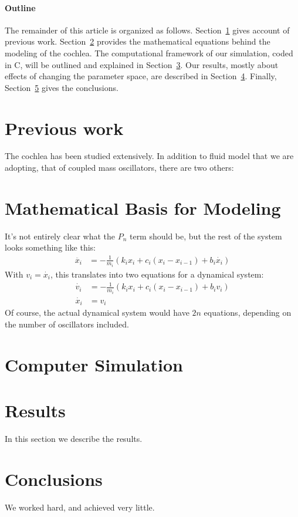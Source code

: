 \documentclass[12pt]{article}
\begin{document}
\paragraph{Outline}
The remainder of this article is organized as follows.
Section~\ref{previous work} gives account of previous work. Section~\ref{modeling} provides the mathematical equations behind the modeling of the cochlea. The computational framework of our simulation, coded in C, will be outlined and explained in Section~\ref{computer simulation}. Our results, mostly about effects of changing the parameter space, are described in Section~\ref{results}.
Finally, Section~\ref{conclusions} gives the conclusions.

\section{Previous work}\label{previous work}
The cochlea has been studied extensively. In addition to fluid model that we are adopting, that of coupled mass oscillators, there are two others: 


\section{Mathematical Basis for Modeling}\label{modeling}
It's not entirely clear what the $P_n$ term should be, but the rest of the system looks something like this:
\begin{align*}
  \ddot{x_i} &= - \frac{1}{m_i} \left( k_i x_i + c_i (x_i-x_{i-1}) + b_i \dot{x_i} \right)
\end{align*}
With $v_i=\dot{x_i}$, this translates into two equations for a dynamical system:
\begin{align*}
  \dot{v_i} &= - \frac{1}{m_i} \left( k_i x_i + c_i (x_i-x_{i-1}) + b_i v_i \right) \\
  \dot{x_i} &= v_i
\end{align*}
Of course, the actual dynamical system would have $2n$ equations, depending on the number
of oscillators included.




\section{Computer Simulation}\label{computer simulation}


\section{Results}\label{results}
In this section we describe the results.

\section{Conclusions}\label{conclusions}
We worked hard, and achieved very little.



\end{document}
